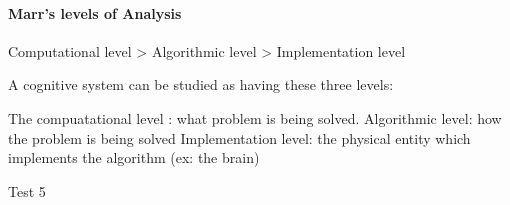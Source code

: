 \paragraph{Marr's levels of Analysis}

Computational level > Algorithmic level > Implementation level

A cognitive system can be studied as having these three levels: 

The compuatational level : what problem is being solved. 
Algorithmic level: how the problem is being solved
Implementation level: the physical entity which implements the algorithm (ex: the brain)

Test 5





















